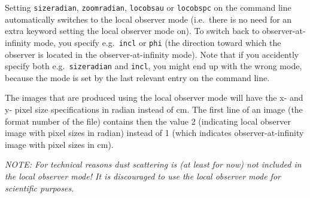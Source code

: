 \documentclass{report}
\begin{document}
Setting {\small\tt sizeradian}, {\small\tt zoomradian}, {\small\tt locobsau}
or {\small\tt locobspc} on the command line automatically switches to the
local observer mode (i.e.\ there is no need for an extra keyword setting the
local observer mode on). To switch back to observer-at-infinity mode, you
specify e.g.~{\small\tt incl} or {\small\tt phi} (the direction toward which
the observer is located in the observer-at-infinity mode). Note that if you
accidently specify both e.g.~{\small\tt sizeradian} and {\small\tt incl},
you might end up with the wrong mode, because the mode is set by the last
relevant entry on the command line.

The images that are produced using the local observer mode will have the x-
and y- pixel size specifications in radian instead of cm. The first line of
an image (the format number of the file) contains then the value 2
(indicating local observer image with pixel sizes in radian) instead of 1
(which indicates observer-at-infinity image with pixel sizes in cm).

{\em NOTE: For technical reasons dust scattering is (at least for now) not
included in the local observer mode! It is discouraged to use the local
observer mode for scientific purposes.}
\end{document}
